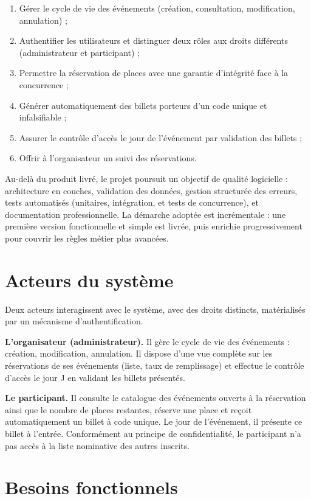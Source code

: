 \documentclass[12pt,a4paper]{report}
\begin{document}
\begin{enumerate}
\item Gérer le cycle de vie des événements (création, consultation, modification, annulation) ;
\item Authentifier les utilisateurs et distinguer deux rôles aux droits différents (administrateur et participant) ;
\item Permettre la réservation de places avec une garantie d'intégrité face à la concurrence ;
\item Générer automatiquement des billets porteurs d'un code unique et infalsifiable ;
\item Assurer le contrôle d'accès le jour de l'événement par validation des billets ;
\item Offrir à l'organisateur un suivi des réservations.
\end{enumerate}

Au-delà du produit livré, le projet poursuit un objectif de qualité logicielle : architecture en couches, validation des données, gestion structurée des erreurs, tests automatisés (unitaires, intégration, et tests de concurrence), et documentation professionnelle. La démarche adoptée est incrémentale : une première version fonctionnelle et simple est livrée, puis enrichie progressivement pour couvrir les règles métier plus avancées.

\section{Acteurs du système}

Deux acteurs interagissent avec le système, avec des droits distincts, matérialisés par un mécanisme d'authentification.

\textbf{L'organisateur (administrateur).} Il gère le cycle de vie des événements : création, modification, annulation. Il dispose d'une vue complète sur les réservations de ses événements (liste, taux de remplissage) et effectue le contrôle d'accès le jour J en validant les billets présentés.

\textbf{Le participant.} Il consulte le catalogue des événements ouverts à la réservation ainsi que le nombre de places restantes, réserve une place et reçoit automatiquement un billet à code unique. Le jour de l'événement, il présente ce billet à l'entrée. Conformément au principe de confidentialité, le participant n'a pas accès à la liste nominative des autres inscrits.

\section{Besoins fonctionnels}
\end{document}
